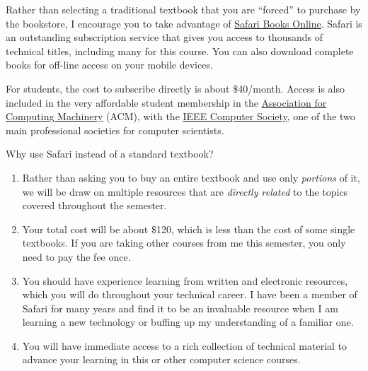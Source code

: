 Rather than selecting a traditional textbook
that you are ``forced'' to purchase by the bookstore,
I encourage you to take advantage of 
\href{https://www.safaribooksonline.com/}{Safari Books Online}.
Safari is an outstanding subscription service that gives you access
to thousands of technical titles,
including many for this course.
You can also download complete books for off-line
access on your mobile devices.

For students, the cost to subscribe directly is about \$40/month.
Access is also included in the very affordable student membership in the
\href{https://www.acm.org/}{Association for Computing Machinery} (ACM),
with the \href{https://www.computer.org/}{IEEE Computer Society},
one of the two main professional societies for computer scientists.

Why use Safari instead of a standard textbook?
\begin{enumerate}
\item
  Rather than asking you to buy an entire textbook
  and use only \emph{portions} of it,
  we will be draw on multiple resources
  that are \emph{directly related} to the topics 
  covered throughout the semester.
\item
  Your total cost will be about \$120,
  which is less than the cost of some single textbooks.
  If you are taking other courses from me this semester,
  you only need to pay the fee once.
\item
  You should have experience learning from written
  and electronic resources, which you will do
  throughout your technical career.
  I have been a member of Safari for many years
  and find it to be an invaluable resource
  when I am learning a new technology
  or buffing up my understanding of a familiar one.
\item
  You will have immediate access to a rich collection
  of technical material to advance your learning in this
  or other computer science courses.
\end{enumerate}


